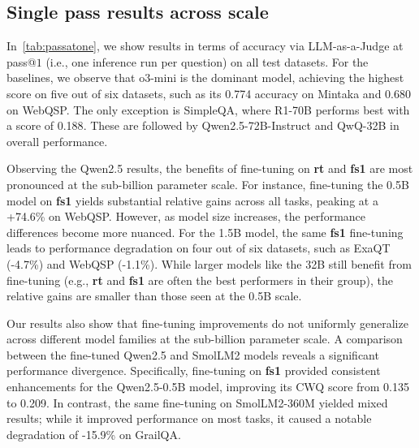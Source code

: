 \documentclass[11pt]{article}
\newcommand{\dataset}{\textbf{fs1}}
\newcommand{\datasetrt}{\textbf{\textbf{rt}}}
\begin{document}
\subsection{Single pass results across scale}
In~\cref{tab:passatone}, we show results in terms of accuracy via LLM-as-a-Judge at pass@$1$ (i.e., one inference run per question) on all test datasets.
For the baselines, we observe that {o3-mini} is the dominant model, achieving the highest score on five out of six datasets, such as its 0.774 accuracy on Mintaka and 0.680 on WebQSP. The only exception is SimpleQA, where {R1-70B} performs best with a score of {0.188}. These are followed by {Qwen2.5-72B-Instruct} and {QwQ-32B} in overall performance.

Observing the {Qwen2.5} results, the benefits of fine-tuning on \datasetrt{} and \dataset{} are most pronounced at the sub-billion parameter scale. For instance, fine-tuning the {0.5B} model on \dataset{} yields substantial relative gains across all tasks, peaking at a +74.6\% on WebQSP. However, as model size increases, the performance differences become more nuanced. For the {1.5B} model, the same \textbf{fs1} fine-tuning leads to performance degradation on four out of six datasets, such as ExaQT (-4.7\%) and WebQSP (-1.1\%). While larger models like the {32B} still benefit from fine-tuning (e.g., \textbf{rt} and \textbf{fs1} are often the best performers in their group), the relative gains are smaller than those seen at the 0.5B scale.

Our results also show that fine-tuning improvements do not uniformly generalize across different model families at the sub-billion parameter scale.
A comparison between the fine-tuned Qwen2.5 and SmolLM2 models reveals a significant performance divergence. Specifically, fine-tuning on \dataset{} provided consistent enhancements for the {Qwen2.5-0.5B} model, improving its CWQ score from 0.135 to 0.209. In contrast, the same fine-tuning on {SmolLM2-360M} yielded mixed results; while it improved performance on most tasks, it caused a notable degradation of -15.9\% on GrailQA.
\end{document}
